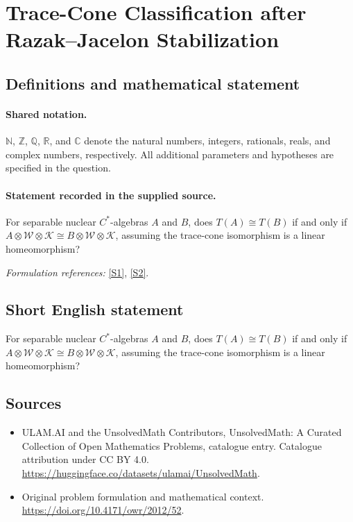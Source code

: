 \documentclass[11pt]{article}
\newcommand{\sref}[2]{\hyperlink{source:#1:#2}{[S#2]}}
\begin{document}
\section{Trace-Cone Classification after Razak–Jacelon Stabilization}\label{statement}

\subsection{Definitions and mathematical statement}

\paragraph{Shared notation.}$\mathbb N$, $\mathbb Z$, $\mathbb Q$, $\mathbb R$, and $\mathbb C$ denote the natural numbers, integers, rationals, reals, and complex numbers, respectively. All additional parameters and hypotheses are specified in the question.


\paragraph{Statement recorded in the supplied source.}
For separable nuclear $C^*$-algebras $A$ and $B$, does $T(A)\cong T(B)$ if and only if $A\otimes\mathcal W\otimes\mathcal K\cong B\otimes\mathcal W\otimes\mathcal K$, assuming the trace-cone isomorphism is a linear homeomorphism?
\par\smallskip\textit{Formulation references:} \sref{statement}{1}, \sref{statement}{2}.
\subsection{Short English statement}
For separable nuclear $C^*$-algebras $A$ and $B$, does $T(A)\cong T(B)$ if and only if $A\otimes\mathcal W\otimes\mathcal K\cong B\otimes\mathcal W\otimes\mathcal K$, assuming the trace-cone isomorphism is a linear homeomorphism?
\subsection{Sources}
\begin{itemize}
\item[\hypertarget{source:statement:1}{S1}] ULAM.AI and the UnsolvedMath Contributors, UnsolvedMath: A Curated Collection of Open Mathematics Problems, catalogue entry. Catalogue attribution under CC BY 4.0.
\url{https://huggingface.co/datasets/ulamai/UnsolvedMath}.
\item[\hypertarget{source:statement:2}{S2}] Original problem formulation and mathematical context.
\url{https://doi.org/10.4171/owr/2012/52}.
\end{itemize}
\label{end:statement}
\end{document}
